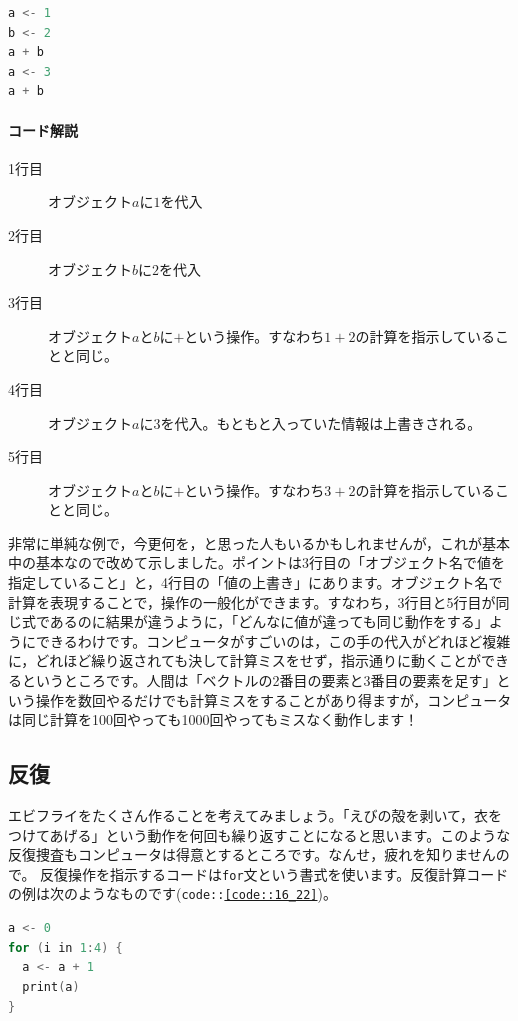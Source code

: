 \documentclass{ltjsbook}
\begin{document}
\begin{lstlisting}[language=c++,label={code::16_12},caption={代入操作}]
a <- 1
b <- 2
a + b
a <- 3
a + b
\end{lstlisting}

\paragraph{コード解説}
\begin{description}
        \item[1行目] オブジェクト$a$に$1$を代入
        \item[2行目] オブジェクト$b$に$2$を代入
        \item[3行目] オブジェクト$a$と$b$に$+$という操作。すなわち$1+2$の計算を指示していることと同じ。
        \item[4行目] オブジェクト$a$に$3$を代入。もともと入っていた情報は上書きされる。
        \item[5行目] オブジェクト$a$と$b$に$+$という操作。すなわち$3+2$の計算を指示していることと同じ。
\end{description}

非常に単純な例で，今更何を，と思った人もいるかもしれませんが，これが基本中の基本なので改めて示しました。ポイントは3行目の「オブジェクト名で値を指定していること」と，4行目の「値の上書き」にあります。オブジェクト名で計算を表現することで，操作の一般化ができます。すなわち，3行目と5行目が同じ式であるのに結果が違うように，「どんなに値が違っても同じ動作をする」ようにできるわけです。コンピュータがすごいのは，この手の代入がどれほど複雑に，どれほど繰り返されても決して計算ミスをせず，指示通りに動くことができるというところです。人間は「ベクトルの2番目の要素と3番目の要素を足す」という操作を数回やるだけでも計算ミスをすることがあり得ますが，コンピュータは同じ計算を100回やっても1000回やってもミスなく動作します！

\subsection{反復}
エビフライをたくさん作ることを考えてみましょう。「えびの殻を剥いて，衣をつけてあげる」という動作を何回も繰り返すことになると思います。このような反復捜査もコンピュータは得意とするところです。なんせ，疲れを知りませんので。
反復操作を指示するコードは\texttt{for}文という書式を使います。反復計算コードの例は次のようなものです(\texttt{code::\ref{code::16_22}})。

\begin{lstlisting}[language=c++,label={code::16_22},caption={反復操作1}]
a <- 0
for (i in 1:4) {
  a <- a + 1
  print(a)
}
\end{lstlisting}
\end{document}

